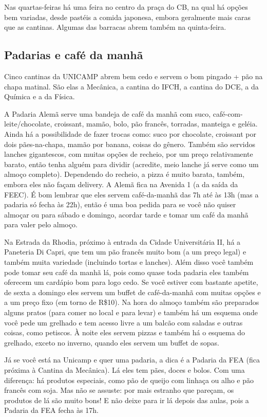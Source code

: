 Nas quartas-feiras há uma feira no centro da praça do CB, na qual há opções bem
variadas, desde pastéis a comida japonesa, embora geralmente mais caras que as
cantinas. Algumas das barracas abrem também na quinta-feira. 

\subsection{Padarias e café da manhã}
Cinco cantinas da UNICAMP abrem bem cedo e servem o bom pingado + pão na chapa
matinal. São elas a Mecânica, a cantina do IFCH, a cantina do DCE, a da Química
e a da Física.

A Padaria Alemã serve uma bandeja de café da manhã com suco,
café-com-leite/chocolate, croissant, mamão, bolo, pão francês, torradas,
manteiga e geléia. Ainda há a possibilidade de fazer trocas como: suco por
chocolate, croissant por dois pães-na-chapa, mamão por banana, coisas do gênero.
Também são servidos lanches gigantescos, com muitas opções de recheio, por um
preço relativamente barato, então tenha alguém para dividir (acredite, meio
lanche já serve como um almoço completo). Dependendo do recheio, a pizza é muito
barata, também, embora eles não façam delivery. A Alemã fica na Avenida 1 (a da
saída da FEEC). É bom lembrar que eles servem café-da-manhã das 7h até às 13h
(mas a padaria só fecha às 22h), então é uma boa pedida para se você não quiser
almoçar ou para sábado e domingo, acordar tarde e tomar um café da manhã para
valer pelo almoço.

Na Estrada da Rhodia, próximo à entrada da Cidade Universitária II, há
a Paneteria Di Capri, que tem um pão francês muito bom (a um preço legal)
e também muita variedade (incluindo tortas e lanches). Além disso você também
pode tomar seu café da manhã lá, pois como quase toda padaria eles também
oferecem um cardápio bom para logo cedo. Se você estiver com bastante apetite,
de sexta a domingo eles servem um buffet de café-da-manhã com muitas opções
e a um preço fixo (em torno de R\$10). Na hora do almoço também são preparados
alguns pratos (para comer no local e para levar) e também há um esquema onde
você pede um grelhado e tem acesso livre a um balcão com saladas e outras
coisas, como petiscos. À noite eles servem pizzas e também há o esquema do
grelhado, exceto no inverno, quando eles servem um buffet de sopas.

Já se você está na Unicamp e quer uma padaria, a dica é a Padaria da FEA (fica
próxima à Cantina da Mecânica). Lá eles tem pães, doces e bolos. Com uma
diferença: há produtos especiais, como pão de queijo com linhaça ou alho e pão
francês com soja. Mas não se assuste: por mais estranho que pareçam, os produtos
de lá são muito bons! E não deixe para ir lá depois das aulas, pois a Padaria da
FEA fecha às 17h. 

